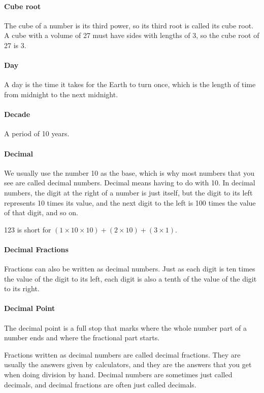 \documentclass[12pt]{article}
\begin{document}
\paragraph{Cube root}
The cube of a number is its third power, so its third root is called its cube root. A cube with a volume of 27 must have sides with lengths of 3, so the cube root of 27 is 3.

\paragraph{Day}
A day is the time it takes for the Earth to turn once, which is the length of time from midnight to the next midnight.

\paragraph{Decade}
A period of 10 years.

\paragraph{Decimal}
We usually use the number 10 as the base, which is why most numbers that you see are called decimal numbers. Decimal means having to do with 10. In decimal numbers, the digit at the right of a number is just itself, but the digit to its left represents 10 times its value, and the next digit to the left is 100 times the value of that digit, and so on.

123 is short for $(1 \times 10 \times 10) + (2 \times 10) + (3 \times 1)$.

\paragraph{Decimal Fractions}
Fractions can also be written as decimal numbers. Just as each digit is ten times the value of the digit to its left, each digit is also a tenth of the value of the digit to its right.

\paragraph{Decimal Point}
The decimal point is a full stop that marks where the whole number part of a number ends and where the fractional part starts.

Fractions written as decimal numbers are called decimal fractions. They are usually the answers given by calculators, and they are the answers that you get when doing division by hand. Decimal numbers are sometimes just called decimals, and decimal fractions are often just called decimals.
\end{document}
